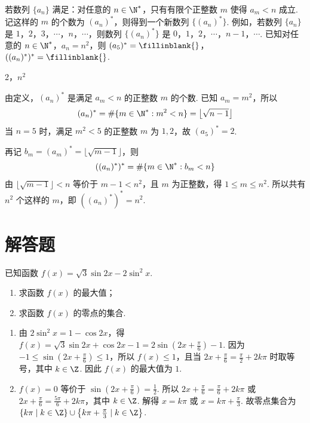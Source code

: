\begin{problem}
若数列 \(\{a_n\}\) 满足：对任意的 \(n \in \N^{*}\)，只有有限个正整数 \(m\) 使得 \(a_m < n\) 成立. 记这样的 \(m\) 的个数为 \((a_n)^*\)，则得到一个新数列 \(\{(a_n)^*\}\). 例如，若数列 \(\{a_n\}\) 是 \(1\)，\(2\)，\(3\)，\(\cdots\)，\(n\)，\(\cdots\)，则数列 \(\{(a_n)^*\}\) 是 \(0\)，\(1\)，\(2\)，\(\cdots\)，\(n - 1\)，\(\cdots\). 已知对任意的 \(n \in \N^{*}\)，\(a_n = n^2\)，则 \((a_5)^* =\fillinblank{}\)，\(((a_n)^*)^* =\fillinblank{}\).
\end{problem}

\begin{answer}
2，\(n^2\)
\end{answer}

\begin{solution}
由定义，\((a_n)^*\) 是满足 \(a_m<n\) 的正整数 \(m\) 的个数. 已知 \(a_m=m^2\)，所以
\[
(a_n)^*=\#\{m\in\N^*:m^2<n\}=\left\lfloor\sqrt{n-1}\right\rfloor
\]
当 \(n=5\) 时，满足 \(m^2<5\) 的正整数 \(m\) 为 \(1,2\)，故 \((a_5)^*=2\).

再记 \(b_m=(a_m)^*=\lfloor\sqrt{m-1}\rfloor\)，则
\[
((a_n)^*)^*=\#\{m\in\N^*:b_m<n\}
\]
由 \(\lfloor\sqrt{m-1}\rfloor<n\) 等价于 \(m-1<n^2\)，且 \(m\) 为正整数，得 \(1\leqslant m\leqslant n^2\). 所以共有 \(n^2\) 个这样的 \(m\)，即
\( ((a_n)^*)^*=n^2\).
\end{solution}

\section{解答题}

\begin{problem}
已知函数 \( f(x) = \sqrt{3}\sin 2x - 2\sin^2 x \).

\begin{enumerate}
\item 求函数 \(f(x)\) 的最大值；
\item 求函数 \(f(x)\) 的零点的集合.
\end{enumerate}

\begin{solution}
\begin{enumerate}
\item 由 \(2\sin^2x=1-\cos2x\)，得 \(f(x)=\sqrt{3}\sin2x+\cos2x-1=2\sin\left(2x+\frac{\pi}{6}\right)-1\). 因为 \(-1\leqslant\sin\left(2x+\frac{\pi}{6}\right)\leqslant1\)，所以 \(f(x)\leqslant1\)，且当 \(2x+\frac{\pi}{6}=\frac{\pi}{2}+2k\pi\) 时取等号，其中 \(k\in\Z\). 因此 \(f(x)\) 的最大值为 \(1\).
\item \(f(x)=0\) 等价于 \(\sin\left(2x+\frac{\pi}{6}\right)=\frac{1}{2}\). 所以 \(2x+\frac{\pi}{6}=\frac{\pi}{6}+2k\pi\) 或 \(2x+\frac{\pi}{6}=\frac{5\pi}{6}+2k\pi\)，其中 \(k\in\Z\). 解得 \(x=k\pi\) 或 \(x=k\pi+\frac{\pi}{3}\). 故零点集合为 \(\left\{k\pi\mid k\in\Z\right\}\cup\left\{k\pi+\frac{\pi}{3}\mid k\in\Z\right\}\).
\end{enumerate}
\end{solution}
\end{problem}


